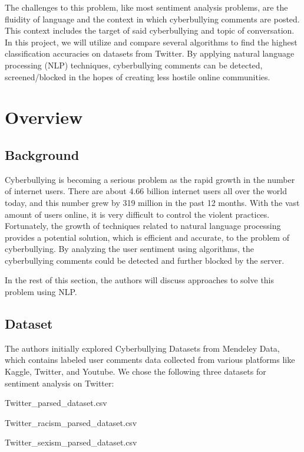 \documentclass[conference]{IEEEtran}
\begin{document}
The challenges to this problem, like most sentiment analysis problems, are the fluidity of language and the context in which cyberbullying comments are posted. This context includes the target of said cyberbullying and topic of conversation. In this project, we will utilize and compare several algorithms to find the highest classification accuracies on datasets from Twitter. By applying natural language processing (NLP) techniques, cyberbullying comments can be detected, screened/blocked in the hopes of creating less hostile online communities. 


\section{Overview}

\subsection{Background}

Cyberbullying is becoming a serious problem as the rapid growth in the number of internet users. There are about 4.66 billion internet users all over the world today, and this number grew by 319 million in the past 12 months. With the vast amount of users online, it is very difficult to control the violent practices. Fortunately, the growth of techniques related to natural language processing provides a potential solution, which is efficient and accurate, to the problem of cyberbullying. By analyzing the user sentiment using algorithms, the cyberbullying comments could be detected and further blocked by the server.

In the rest of this section, the authors will discuss approaches to solve this problem using NLP.

\subsection{Dataset}

The authors initially explored Cyberbullying Datasets from Mendeley Data, which contains labeled user comments data collected from various platforms like Kaggle, Twitter, and Youtube. We chose the following three datasets for sentiment analysis on Twitter:

\begin{center}
Twitter\_parsed\_dataset.csv

Twitter\_racism\_parsed\_dataset.csv

Twitter\_sexism\_parsed\_dataset.csv
\end{center}
\end{document}
